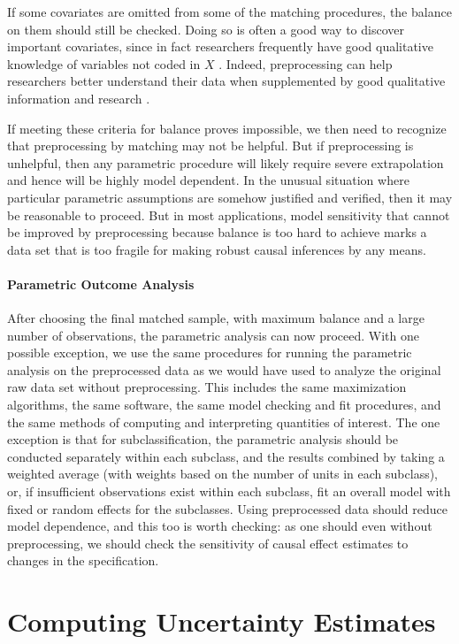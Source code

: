 \documentclass[11pt,titlepage]{article}
\begin{document}
If some covariates are omitted from some of the matching procedures,
the balance on them should still be checked.  Doing so is often a good
way to discover important covariates, since in fact researchers
frequently have good qualitative knowledge of variables not coded in
$X$ \citep[][Ch.3]{Rosenbaum02}.  Indeed, preprocessing can help
researchers better understand their data when supplemented by good
qualitative information and research \citep[e.g.,][]{RosSil01}.

If meeting these criteria for balance proves impossible, we then need
to recognize that preprocessing by matching may not be helpful.  But
if preprocessing is unhelpful, then any parametric procedure will
likely require severe extrapolation and hence will be highly model
dependent.  In the unusual situation where particular parametric
assumptions are somehow justified and verified, then it may be
reasonable to proceed.  But in most applications, model sensitivity
that cannot be improved by preprocessing because balance is too hard
to achieve marks a data set that is too fragile for making robust
causal inferences by any means.

\paragraph{Parametric Outcome Analysis}  
After choosing the final matched sample, with maximum balance and a
large number of observations, the parametric analysis can now proceed.
With one possible exception, we use the same procedures for running
the parametric analysis on the preprocessed data as we would have used
to analyze the original raw data set without preprocessing.  This
includes the same maximization algorithms, the same software, the same
model checking and fit procedures, and the same methods of computing
and interpreting quantities of interest.  The one exception is that
for subclassification, the parametric analysis should be conducted
separately within each subclass, and the results combined by taking a
weighted average (with weights based on the number of units in each
subclass), or, if insufficient observations exist within each
subclass, fit an overall model with fixed or random effects for the
subclasses.  Using preprocessed data should reduce model dependence,
and this too is worth checking: as one should even without
preprocessing, we should check the sensitivity of causal effect
estimates to changes in the specification.

\section{Computing Uncertainty Estimates}
\end{document}
